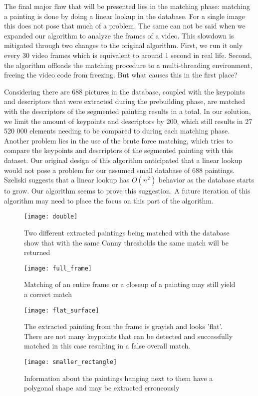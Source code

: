 The final major flaw that will be presented lies in the matching phase: matching a painting is done by doing a linear lookup in the database. For a single image this does not pose that much of a problem. The same can not be said when we expanded our algorithm to analyze the frames of a video. This slowdown is mitigated through two changes to the original algorithm. First, we run it only every 30 video frames which is equivalent to around 1 second in real life. Second, the algorithm offloads the matching procedure to a multi-threading environment, freeing the video code from freezing. But what causes this in the first place? 


Considering there are 688 pictures in the database, coupled with the keypoints and descriptors that were extracted during the prebuilding phase, are matched with the descriptors of the segmented painting results in a total. In our solution, we limit the amount of keypoints and descriptors by 200, which still results in 27 520 000 elements needing to be compared to during each matching phase. Another problem lies in the use of the brute force matching, which tries to compare the keypoints and descriptors of the segmented painting with this dataset. Our original design of this algorithm anticipated that a linear lookup would not pose a problem for our assumed small database of 688 paintings. Szeliski \cite{Szeliski2010} suggests that a linear lookup has $O(n^{2})$ behavior as the database starts to grow. Our algorithm seems to prove this suggestion. A future iteration of this algorithm may need to place the focus on this part of the algorithm.


\begin{figure}
	\texttt{[image: double]}
	\caption{Two different extracted paintings being matched with the database show that with the same Canny thresholds the same match will be returned}
	\label{fig:double}
\end{figure}

\begin{figure}
	\texttt{[image: full\_frame]}
	\caption{Matching of an entire frame or a closeup of a painting may still yield a correct match}
	\label{fig:full_frame}
\end{figure}

\begin{figure}
	\texttt{[image: flat\_surface]}
	\caption{The extracted painting from the frame is grayish and looks 'flat'. There are not many keypoints that can be detected and successfully matched in this case resulting in a false overall match.}
	\label{fig:flat_surface}
\end{figure}

\begin{figure}
	\texttt{[image: smaller\_rectangle]}
	\caption{Information about the paintings hanging next to them have a polygonal shape and may be extracted erroneously}
	\label{fig:smaller_rectangle}
\end{figure}